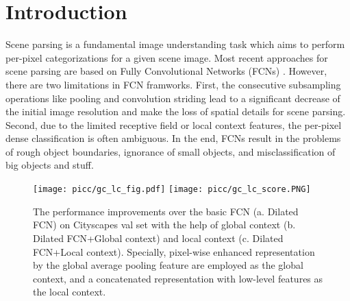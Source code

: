 \documentclass[10pt,twocolumn,letterpaper]{article}
\begin{document}
\section{Introduction}

Scene parsing is a fundamental image understanding task which aims to perform per-pixel categorizations for a given scene image. Most recent approaches for scene parsing are based on Fully Convolutional Networks (FCNs) \cite{FCN}. However, there are two limitations in FCN framworks. First, the consecutive subsampling operations like pooling and convolution striding lead to a significant decrease of the initial image resolution and make the loss of spatial details for scene parsing. Second, due to the limited receptive field \cite{parsenet,luo2016understanding} or local context features, the per-pixel dense classification is often ambiguous. In the end, FCNs result in the problems of rough object boundaries, ignorance of small objects, and misclassification of big objects and stuff.

\begin{figure}[!t]
        \centering
        \texttt{[image: picc/gc\_lc\_fig.pdf]}
       \texttt{[image: picc/gc\_lc\_score.PNG]}

        \caption{The performance improvements over the basic FCN (a. Dilated FCN) on Cityscapes val set with the help of global context (b. Dilated FCN+Global context) and local context (c. Dilated FCN+Local context). Specially, pixel-wise enhanced representation by the global average pooling feature are employed as the global context, and a concatenated representation with low-level features as the local context.  }
        \label{example}\vspace{-1em}
\end{figure}
\end{document}
